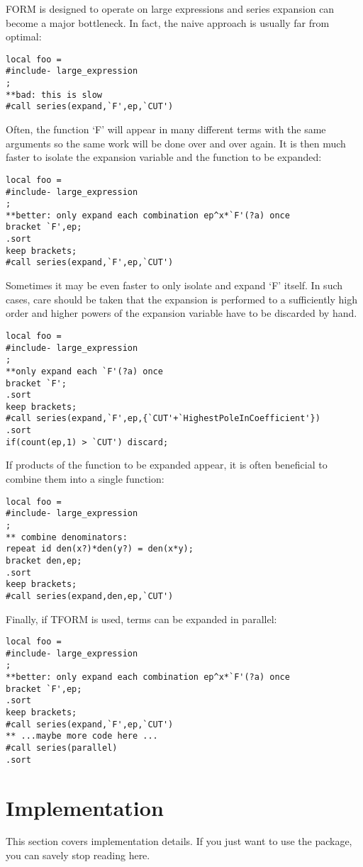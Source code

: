 \documentclass[titlepage]{article}
\begin{document}
FORM is designed to operate on large expressions and series expansion
can become a major bottleneck. In fact, the naive approach is usually
far from optimal:
\begin{lstlisting}
local foo =
#include- large_expression
;
**bad: this is slow
#call series(expand,`F',ep,`CUT')
\end{lstlisting}
Often, the function `F' will appear in many different terms with the
same arguments so the same work will be done over and over again. It is
then much faster to isolate the expansion variable and the function to
be expanded:
\begin{lstlisting}
local foo =
#include- large_expression
;
**better: only expand each combination ep^x*`F'(?a) once
bracket `F',ep;
.sort
keep brackets;
#call series(expand,`F',ep,`CUT')
\end{lstlisting}
Sometimes it may be even faster to only isolate and expand `F'
itself. In such cases, care should be taken that the expansion is
performed to a sufficiently high order and higher powers of the
expansion variable have to be discarded by hand.
\begin{lstlisting}
local foo =
#include- large_expression
;
**only expand each `F'(?a) once
bracket `F';
.sort
keep brackets;
#call series(expand,`F',ep,{`CUT'+`HighestPoleInCoefficient'})
.sort
if(count(ep,1) > `CUT') discard;
\end{lstlisting}
If products of the function to be expanded appear, it is often
beneficial to combine them into a single function:
\begin{lstlisting}
local foo =
#include- large_expression
;
** combine denominators:
repeat id den(x?)*den(y?) = den(x*y);
bracket den,ep;
.sort
keep brackets;
#call series(expand,den,ep,`CUT')
\end{lstlisting}
Finally, if TFORM is used, terms can be expanded in parallel:
\begin{lstlisting}
local foo =
#include- large_expression
;
**better: only expand each combination ep^x*`F'(?a) once
bracket `F',ep;
.sort
keep brackets;
#call series(expand,`F',ep,`CUT')
** ...maybe more code here ...
#call series(parallel)
.sort
\end{lstlisting}


\appendix

\section{Implementation}
\label{sec:impl}

This section covers implementation details. If you just want to use the
package, you can savely stop reading here.
\end{document}
